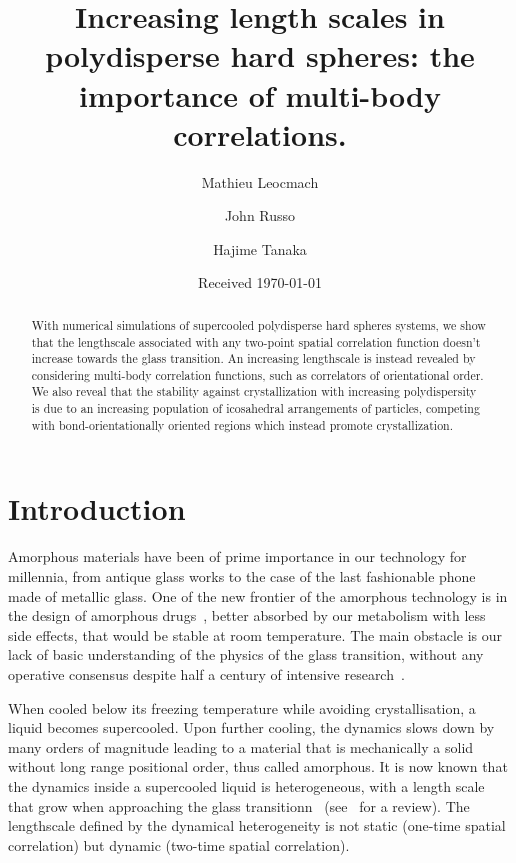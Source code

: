 \documentclass[twocolumn,superscriptaddress]{revtex4-1}
\begin{document}
\title{Increasing length scales in polydisperse hard spheres: the importance of multi-body correlations.} 

\author{Mathieu Leocmach}
\author{John Russo}
\author{Hajime Tanaka}

\date{Received \today}

\begin{abstract}
With numerical simulations of supercooled polydisperse hard spheres systems,
we show that the lengthscale associated with any two-point spatial correlation function
doesn't increase towards the glass transition. An increasing lengthscale is instead revealed
by considering multi-body correlation functions, such as correlators of orientational order.
We also reveal that the stability against crystallization with increasing polydispersity
is due to an increasing population of icosahedral arrangements of particles, competing with bond-orientationally
oriented regions which instead promote crystallization.

\end{abstract}

\maketitle

\section{Introduction}

Amorphous materials have been of prime importance in our technology for millennia, from antique glass works to the case of the last fashionable phone made of metallic glass. One of the new frontier of the amorphous technology is in the design of amorphous drugs~\cite{Petit2006,Grzybowska2012}, better absorbed by our metabolism with less side effects, that would be stable at room temperature. The main obstacle is our lack of basic understanding of the physics of the glass transition, without any operative consensus despite half a century of intensive research~\citep{cavagna2009supercooled,BerthierR}.

When cooled below its freezing temperature while avoiding crystallisation, a liquid becomes supercooled. Upon further cooling, the dynamics slows down by many orders of magnitude leading to a material that is mechanically a solid without long range positional order, thus called amorphous. It is now known that the dynamics inside a supercooled liquid is heterogeneous, with a length scale that grow when approaching the glass transitionn~\citep{yamamoto1998,Donati1999a} (see~\citep{BerthierR} for a review). The lengthscale defined by the dynamical heterogeneity is not static (one-time spatial correlation) but dynamic (two-time spatial correlation).
\end{document}
